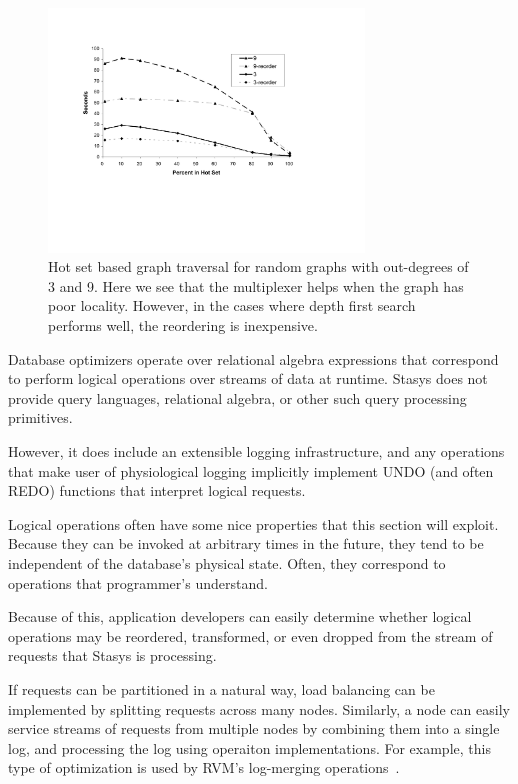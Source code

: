 \documentclass[letterpaper,twocolumn,10pt]{article}
\newcommand{\yad}{Stasys\xspace}
\begin{document}
\begin{figure}[t]
\includegraphics[width=3.3in]{figs/trans-closure-hotset.pdf}
\vspace{-12pt}
\caption{\sf\label{fig:hotGraph} Hot set based graph traversal for random graphs with out-degrees of 3 and 9.  Here
we see that the multiplexer helps when the graph has poor locality.
However, in the cases where depth first search performs well, the
reordering is inexpensive.}
\end{figure}

Database optimizers operate over relational algebra expressions that
correspond to perform logical operations over streams of data at runtime.  \yad
does not provide query languages, relational algebra, or other such query processing primitives.  

However, it does include an extensible logging infrastructure, and any
operations that make user of physiological logging implicitly
implement UNDO (and often REDO) functions that interpret logical
requests.

Logical operations often have some nice properties that this section
will exploit.  Because they can be invoked at arbitrary times in the
future, they tend to be independent of the database's physical state.
Often, they correspond to operations that programmer's understand.

Because of this, application developers can easily determine whether
logical operations may be reordered, transformed, or even
dropped from the stream of requests that \yad is processing.

If requests can be partitioned in a natural way, load
balancing can be implemented by splitting requests across many nodes.
Similarly, a node can easily service streams of requests from multiple
nodes by combining them into a single log, and processing the log
using operaiton implementations.  For example, this type of optimization 
is used by RVM's log-merging operations~\cite{rvm}.
\end{document}
